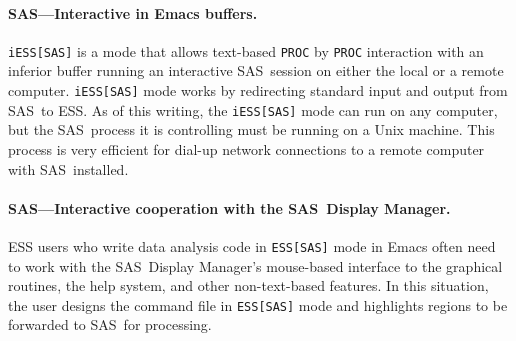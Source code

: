 \documentclass{article}
\newcommand*{\SAS}{\textsc{SAS}}
\newcommand{\stexttt}[1]{{\small\texttt{#1}}}
\begin{document}
\paragraph{\SAS---Interactive in Emacs buffers.}

\stexttt{iESS[SAS]} is a mode that allows text-based \stexttt{PROC} by
\stexttt{PROC} interaction with an inferior buffer running an
interactive \SAS\ session on either the local or 
a remote computer.  \stexttt{iESS[SAS]} mode works by
redirecting standard input and output from \SAS\ to ESS.
As of this writing, the \stexttt{iESS[SAS]} mode can run on any computer,
but the \SAS\ process it is controlling must be running  on a Unix machine.
This process is very efficient for dial-up network connections to
a remote computer with \SAS\ installed.


\paragraph{\SAS---Interactive cooperation with the \SAS\ Display Manager.}
ESS users who write data analysis code in \stexttt{ESS[SAS]} mode in Emacs
often need to work with the \SAS\ Display Manager's
mouse-based interface to the graphical
routines, the help system, and other non-text-based features.
In this situation, the user
designs the command file in \stexttt{ESS[SAS]} mode and highlights
regions to be forwarded to \SAS\ for processing.
%
%
%
\end{document}
